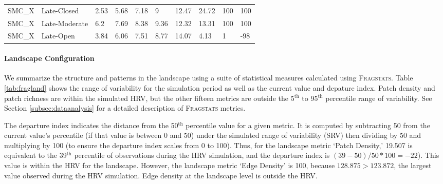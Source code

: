 \begin{sidewaystable}[!htbp]
\begin{tabular}{@{}llllllllll@{}}
\small SMC\_X                   & Late-Closed              & 2.53            & 5.68             & 7.18             & 9                & 12.47             & 24.\small 72                                                              & 100                                                              & \small 100                                                                \\
\small SMC\_X                   & Late-Moderate            & 6.2             & 7.69             & 8.38             & 9.36             & 12.32             & 13.\small 31                                                              & 100                                                              & \small 100                                                                \\
\small SMC\_X                   & Late-Open                & 3.84            & 6.06             & 7.51             & 8.77             & 14.07             & 4.\small 13                                                               & 1                                                                & -98                                                                \\ \bottomrule
\end{tabular}
\end{sidewaystable}






\pagebreak[4]
\paragraph{Landscape Configuration}
We summarize the structure and patterns in the landscape using a suite of statistical measures calculated using \textsc{Fragstats}. Table \ref{tab:fragland} shows the range of variability for the simulation period as well as the current value and depature index. Patch density and patch richness are within the simulated HRV, but the other fifteen metrics are outside the 5$^{\text{th}}$ to 95$^{\text{th}}$ percentile range of variability. See Section \ref{subsec:dataanalysis} for a detailed description of \textsc{Fragstats} metrics.

The departure index indicates the distance from the 50$^{\text{th}}$ percentile value for a given metric. It is computed by subtracting 50 from the current value's percentile (if that value is between 0 and 50) under the simulated range of variability (SRV) then dividing by 50 and multiplying by 100 (to ensure the departure index scales from 0 to 100). Thus, for the landscape metric `Patch Density,' 19.507 is equivalent to the 39$^{\text{th}}$ percentile of observations during the HRV simulation, and the departure index is $(39-50)/50*100 = -22$). This value is within the HRV for the landscape. However, the landscape metric `Edge Density' is 100, because $128.875 > 123.872$, the largest value observed during the HRV simulation. Edge density at the landscape level is outside the HRV.

